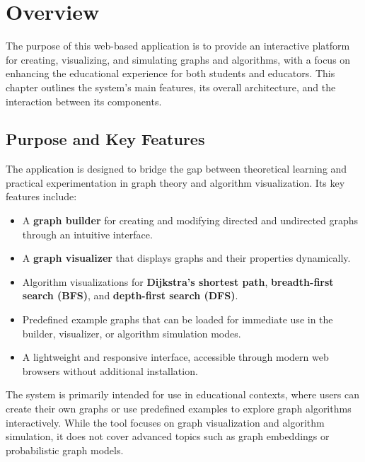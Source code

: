 \section{Overview}
\label{sec:approach}

The purpose of this web-based application is to provide an interactive platform for creating, visualizing, and simulating graphs and algorithms, with a focus on enhancing the educational experience for both students and educators. This chapter outlines the system's main features, its overall architecture, and the interaction between its components.

\subsection{Purpose and Key Features}
The application is designed to bridge the gap between theoretical learning and practical experimentation in graph theory and algorithm visualization. Its key features include:
\begin{itemize}
    \item A \textbf{graph builder} for creating and modifying directed and undirected graphs through an intuitive interface.
    \item A \textbf{graph visualizer} that displays graphs and their properties dynamically.
    \item Algorithm visualizations for \textbf{Dijkstra’s shortest path}, \textbf{breadth-first search (BFS)}, and \textbf{depth-first search (DFS)}.
    \item Predefined example graphs that can be loaded for immediate use in the builder, visualizer, or algorithm simulation modes.
    \item A lightweight and responsive interface, accessible through modern web browsers without additional installation.
\end{itemize}

The system is primarily intended for use in educational contexts, where users can create their own graphs or use predefined examples to explore graph algorithms interactively. While the tool focuses on graph visualization and algorithm simulation, it does not cover advanced topics such as graph embeddings or probabilistic graph models.

